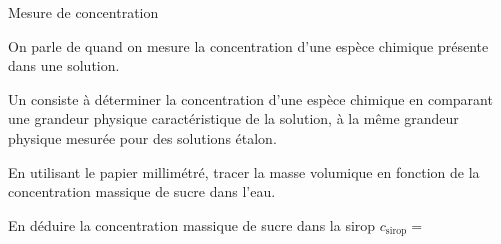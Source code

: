 \begin{doc}{Mesure de concentration}
  \begin{importants}
    On parle de  quand on mesure la concentration d'une espèce chimique présente dans une solution.
  \end{importants}
  \begin{importants}
    Un  consiste à déterminer la concentration d’une espèce chimique en comparant une grandeur physique caractéristique de la solution, à la même grandeur physique mesurée pour des solutions étalon.
  \end{importants}
\end{doc}
 
\numeroQuestion 
En utilisant le papier millimétré, tracer la masse volumique en fonction de la concentration massique de sucre dans l'eau.

\numeroQuestion
En déduire la concentration massique de sucre dans la sirop $c_\text{sirop} =$ 


